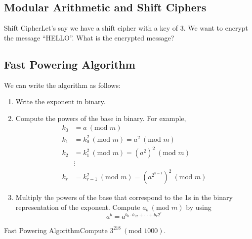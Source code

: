 \subsection{Modular Arithmetic and Shift Ciphers}

\begin{example}
    {Shift Cipher}Let's say we have a shift cipher with a key of 3. We want to encrypt the message ``HELLO''. What is the encrypted message?
\end{example}

\hypertarget{fast powering algorithm}{}
\subsection{Fast Powering Algorithm}

We can write the algorithm as follows: \begin{enumerate}[label=\arabic*.]
    \item Write the exponent in binary.
    \item Compute the powers of the base in binary. For example,
          \begin{align*}
              k_0 & = a \ (\text{mod } m)                                             \\
              k_1 & = k_0^2 \ (\text{mod } m) = a^2 \ (\text{mod } m)                 \\
              k_2 & = k_1^2 \ (\text{mod } m) = (a^2)^{2} \ (\text{mod } m)           \\
                  & \vdots                                                            \\
              k_r & = k_{r-1}^2 \ (\text{mod } m) = (a^{2^{n-1}})^2 \ (\text{mod } m)
          \end{align*}
    \item Multiply the powers of the base that correspond to the 1s in the binary representation of the exponent.
          Compute \(a_b \ (\text{mod } m)\) by using \[a^b = a^{b_0 \cdot b_{12} + \cdots + b_r2^r}\]
\end{enumerate}

\begin{example}
    {Fast Powering Algorithm}Compute \(3^{218} \ (\text{mod } 1000)\).
\end{example}


